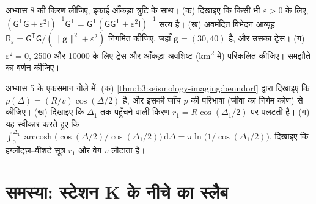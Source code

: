 \begin{exercise}[$\star\star\star$]\label{exo:b3:seismology-imaging:11}
अभ्यास 8 की किरण लीजिए, इकाई आँकड़ा त्रुटि के साथ। (क) दिखाइए कि किसी भी
$\varepsilon > 0$ के लिए, $(\mathsf G^{\mathsf T}\mathsf G + \varepsilon^2\mathsf
I)^{-1}\mathsf G^{\mathsf T} = \mathsf G^{\mathsf T}(\mathsf G\mathsf
G^{\mathsf T} + \varepsilon^2\mathsf I)^{-1}$ सत्य है। (ख) अवमंदित विभेदन
आव्यूह $\mathsf R_\varepsilon = \mathsf G^{\mathsf T}\mathsf G/(\|\mathbf g\|^2 +
\varepsilon^2)$ निगमित कीजिए, जहाँ $\mathbf g = (30, 40)$ है, और उसका ट्रेस। (ग)
$\varepsilon^2 = 0$, 2500 और \num{10000} के लिए ट्रेस और आँकड़ा अवशिष्ट
(\unit{km^2} में) परिकलित कीजिए। समझौते का वर्णन कीजिए।
\end{exercise}

\begin{exercise}[$\star\star\star$]\label{exo:b3:seismology-imaging:12}
अभ्यास 5 के एकसमान गोले में: (क) \cref{thm:b3:seismology-imaging:benndorf} द्वारा
दिखाइए कि $p(\Delta) = (R/v)\cos(\Delta/2)$ है, और इसकी जाँच $p$ की परिभाषा
(जीवा का निर्गम कोण) से कीजिए।
(ख) दिखाइए कि $\Delta_1$ तक पहुँचने वाली किरण $r_1 = R\cos(\Delta_1/2)$ पर पलटती है।
(ग) यह स्वीकार करते हुए कि $\int_0^{\Delta_1}\operatorname{arccosh}\bigl(\cos(\Delta/2)
/\cos(\Delta_1/2)\bigr)\,\mathrm d\Delta = \pi\ln\bigl(1/\cos(\Delta_1/2)\bigr)$,
दिखाइए कि हर्ग्लोट्ज़--वीशर्ट सूत्र $r_1$ और वेग $v$ लौटाता है।
\end{exercise}

\section{समस्या: स्टेशन K के नीचे का स्लैब}

